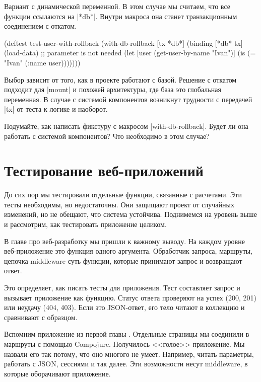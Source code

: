 Вариант с динамической переменной. В этом случае мы считаем, что все функции
ссылаются на \spverb|*db*|. Внутри макроса она станет транзакционным соединением
с откатом.

\begin{english}
  \begin{clojure}
(deftest test-user-with-rollback
  (with-db-rollback [tx *db*]
    (binding [*db* tx]
      (load-data) ;; parameter is not needed
      (let [user (get-user-by-name "Ivan")]
        (is (= "Ivan" (:name user)))))))
  \end{clojure}
\end{english}

Выбор зависит от того, как в проекте работают с базой. Решение с откатом
подходит для \spverb|mount| и похожей архитектуры, где база это глобальная
переменная. В случае с системой компонентов возникнут трудности с передачей
\spverb|tx| от теста к логике и наоборот.

Подумайте, как написать фикстуру с макросом \spverb|with-db-rollback|. Будет ли
она работать с системой компонентов? Что необходимо в этом случае?

\section{Тестирование веб-приложений}

До сих пор мы тестировали отдельные функции, связанные с расчетами. Эти тесты
необходимы, но недостаточны. Они защищают проект от случайных изменений, но не
обещают, что система устойчива. Поднимемся на уровень выше и рассмотрим, как
тестировать приложение целиком.

В главе про веб-разработку мы пришли к важному выводу. На каждом уровне
веб-приложение это функция одного аргумента. Обработчик запроса, маршруты,
цепочка middleware суть функции, которые принимают запрос и возвращают ответ.

Это определяет, как писать тесты для приложения. Тест составляет запрос и
вызывает приложение как функцию. Статус ответа проверяют на успех (200, 201) или
неудачу (404, 403). Если это JSON-ответ, его тело читают в коллекцию и
сравнивают с образцом.

Вспомним приложение из первой главы . Отдельные страницы мы
соединили в маршруты с помощью Compojure. Получилось <<голое>> приложение. Мы
назвали его так потому, что оно многого не умеет. Например, читать параметры,
работать с JSON, сессиями и так далее. Эти возможности несут middleware, в
которые оборачивают приложение.

